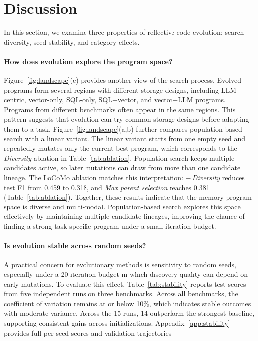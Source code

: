 \section{Discussion}
\label{sec:discussion}

In this section, we examine three properties of reflective code evolution: search diversity, seed stability, and category effects.

\paragraph{How does evolution explore the program space?}

Figure~\ref{fig:landscape}(c) provides another view of the search process.
Evolved programs form several regions with different storage designs, including LLM-centric, vector-only, SQL-only, SQL+vector, and vector+LLM programs.
Programs from different benchmarks often appear in the same regions.
This pattern suggests that evolution can try common storage designs before adapting them to a task.
Figure~\ref{fig:landscape}(a,b) further compares population-based search with a linear variant.
The linear variant starts from one empty seed and repeatedly mutates only the current best program, which corresponds to the \textit{$-$\,Diversity} ablation in Table~\ref{tab:ablation}.
Population search keeps multiple candidates active, so later mutations can draw from more than one candidate lineage.
The LoCoMo ablation matches this interpretation: \textit{$-$\,Diversity} reduces test F1 from 0.459 to 0.318, and \textit{Max parent selection} reaches 0.381 (Table~\ref{tab:ablation}).
Together, these results indicate that the memory-program space is diverse and multi-modal.
Population-based search explores this space effectively by maintaining multiple candidate lineages, improving the chance of finding a strong task-specific program under a small iteration budget.

\paragraph{Is evolution stable across random seeds?}



A practical concern for evolutionary methods is sensitivity to random seeds, especially under a 20-iteration budget in which discovery quality can depend on early mutations.
To evaluate this effect, Table~\ref{tab:stability} reports test scores from five independent runs on three benchmarks.
Across all benchmarks, the coefficient of variation remains at or below 10\%, which indicates stable outcomes with moderate variance.
Across the 15 runs, 14 outperform the strongest baseline, supporting consistent gains across initializations.
Appendix~\ref{app:stability} provides full per-seed scores and validation trajectories.

